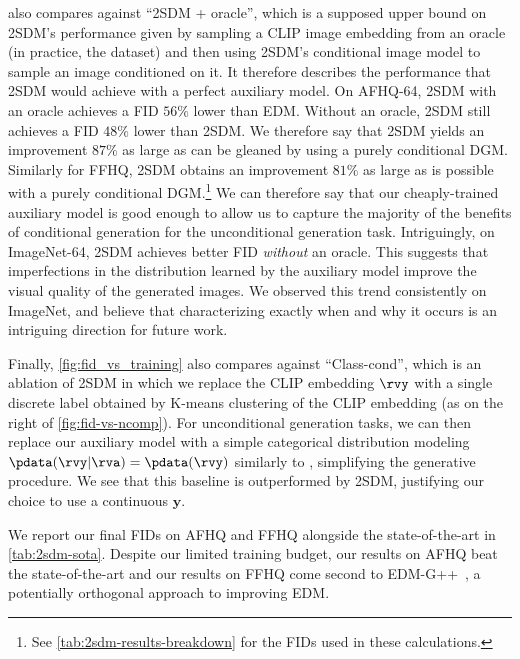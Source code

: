  also compares against ``2SDM + oracle'', which is a supposed upper bound on 2SDM's performance given by sampling a CLIP image embedding from an oracle (in practice, the dataset) and then using 2SDM's conditional image model to sample an image conditioned on it. It therefore describes the performance that 2SDM would achieve with a perfect auxiliary model. On AFHQ-64, 2SDM with an oracle achieves a FID $56\%$ lower than EDM. Without an oracle, 2SDM still achieves a FID $48\%$ lower than 2SDM. We therefore say that 2SDM yields an improvement $87\%$ as large as can be gleaned by using a purely conditional DGM. Similarly for FFHQ, 2SDM obtains an improvement $81\%$ as large as is possible with a purely conditional DGM.\footnote{See \cref{tab:2sdm-results-breakdown} for the FIDs used in these calculations.} We can therefore say that our cheaply-trained auxiliary model is good enough to allow us to capture the majority of the benefits of conditional generation for the unconditional generation task. Intriguingly,
 on ImageNet-64, 2SDM achieves better FID \textit{without} an oracle. This suggests that imperfections in the distribution
learned by the auxiliary model improve the visual quality of the generated images. We observed this trend consistently on ImageNet, and believe that characterizing exactly when and why it occurs is an intriguing direction for future work.

Finally, \cref{fig:fid_vs_training} also compares against ``Class-cond'', which is an ablation of 2SDM in which we replace the CLIP embedding $\rvy$ with a single discrete label obtained by K-means clustering of the CLIP embedding (as on the right of \cref{fig:fid-vs-ncomp}). For unconditional generation tasks, we can then replace our auxiliary model with a simple categorical distribution modeling $\pdata(\rvy|\rva)=\pdata(\rvy)$ similarly to \citet{hu2022self}, simplifying the generative procedure. We see that this baseline is outperformed by 2SDM, justifying our choice to use a continuous $\mathbf{y}$.

We report our final FIDs on AFHQ and FFHQ alongside the state-of-the-art in \cref{tab:2sdm-sota}. Despite our limited training budget, our results on AFHQ beat the state-of-the-art and our results on FFHQ come second to EDM-G++~\citep{kim2022refining}, a potentially orthogonal approach to improving EDM.



